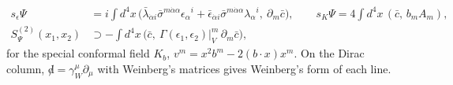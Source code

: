 \begin{remark}
\[
\begin{aligned}
s_\epsilon\Psi&=i\int d^4x\,\big(\bar\lambda_{\dot\alpha i}\bar\sigma^{m\dot\alpha\alpha}\epsilon_\alpha{}^i+\bar\epsilon_{\dot\alpha i}\bar\sigma^{m\dot\alpha\alpha}\lambda_\alpha{}^i,\ \partial_m\bar c\big),\qquad s_{K}\Psi=4\int d^4x\,(\bar c,\,b_mA_m),\\
S^{(2)}_\Psi(x_1,x_2)&\supset-\int d^4x\,\big(\bar c,\ \Gamma(\epsilon_1,\epsilon_2)|_V^m\,\partial_m\bar c\big),
\end{aligned}
\]
for the special conformal field $K_b$, $v^m=x^2b^m-2(b\cdot x)x^m$. On the Dirac column, ${\not d}=\gamma_W^\mu\partial_\mu$ with Weinberg's matrices gives Weinberg's form of each line.
\end{remark}

